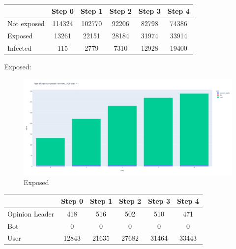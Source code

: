         \begin{table}[H]
            \centering
            \begin{tabular}{|l|c|c|c|c|c|}
            \hline
                        & Step 0 & Step 1 & Step 2 & Step 3 & Step 4 \\ \hline
            Not exposed & 114324 & 102770 & 92206  & 82798  & 74386  \\ \hline
            Exposed     & 13261  & 22151  & 28184  & 31974  & 33914  \\ \hline
            Infected    & 115    & 2779   & 7310   & 12928  & 19400  \\ \hline
            \end{tabular}
        \end{table}
        
        Exposed:
        \begin{figure}[H]
            \includegraphics[width=16cm]{resources/charts/random_1500_bar.png}
            \caption{Exposed}
            \label{fig:random_1500_bar}
        \end{figure}
        
        \begin{table}[H]
            \centering
            \begin{tabular}{|l|c|c|c|c|c|}
            \hline
                           & Step 0 & Step 1 & Step 2 & Step 3 & Step 4 \\ \hline
            Opinion Leader & 418    & 516    & 502    & 510    & 471    \\ \hline
            Bot            & 0      & 0      & 0      & 0      & 0      \\ \hline
            User           & 12843  & 21635  & 27682  & 31464  & 33443  \\ \hline
            \end{tabular}
        \end{table}
        
